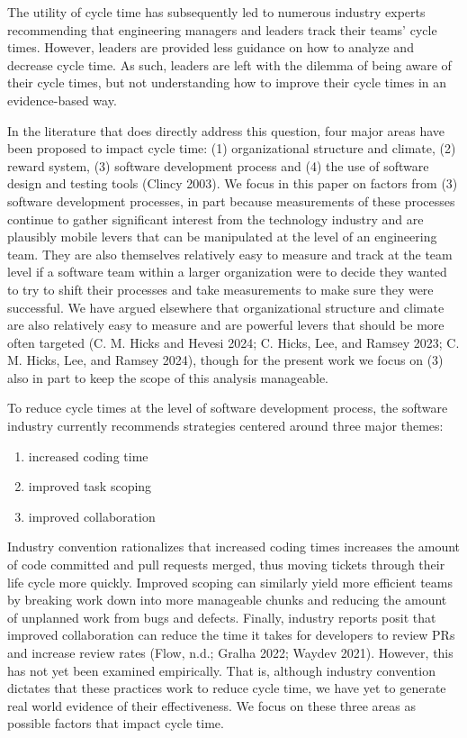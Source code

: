 \documentclass[
]{article}
\providecommand{\tightlist}{%
  \setlength{\itemsep}{0pt}\setlength{\parskip}{0pt}}\usepackage{longtable,booktabs,array}
\begin{document}
The utility of cycle time has subsequently led to numerous industry
experts recommending that engineering managers and leaders track their
teams' cycle times. However, leaders are provided less guidance on how
to analyze and decrease cycle time. As such, leaders are left with the
dilemma of being aware of their cycle times, but not understanding how
to improve their cycle times in an evidence-based way.

In the literature that does directly address this question, four major
areas have been proposed to impact cycle time: (1) organizational
structure and climate, (2) reward system, (3) software development
process and (4) the use of software design and testing tools (Clincy
2003). We focus in this paper on factors from (3) software development
processes, in part because measurements of these processes continue to
gather significant interest from the technology industry and are
plausibly mobile levers that can be manipulated at the level of an
engineering team. They are also themselves relatively easy to measure
and track at the team level if a software team within a larger
organization were to decide they wanted to try to shift their processes
and take measurements to make sure they were successful. We have argued
elsewhere that organizational structure and climate are also relatively
easy to measure and are powerful levers that should be more often
targeted (C. M. Hicks and Hevesi 2024; C. Hicks, Lee, and Ramsey 2023;
C. M. Hicks, Lee, and Ramsey 2024), though for the present work we focus
on (3) also in part to keep the scope of this analysis manageable.

To reduce cycle times at the level of software development process, the
software industry currently recommends strategies centered around three
major themes:

\begin{enumerate}
\def\labelenumi{\arabic{enumi}.}
\tightlist
\item
  increased coding time
\item
  improved task scoping
\item
  improved collaboration
\end{enumerate}

Industry convention rationalizes that increased coding times increases
the amount of code committed and pull requests merged, thus moving
tickets through their life cycle more quickly. Improved scoping can
similarly yield more efficient teams by breaking work down into more
manageable chunks and reducing the amount of unplanned work from bugs
and defects. Finally, industry reports posit that improved collaboration
can reduce the time it takes for developers to review PRs and increase
review rates (Flow, n.d.; Gralha 2022; Waydev 2021). However, this has
not yet been examined empirically. That is, although industry convention
dictates that these practices work to reduce cycle time, we have yet to
generate real world evidence of their effectiveness. We focus on these
three areas as possible factors that impact cycle time.
\end{document}

